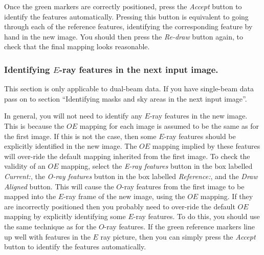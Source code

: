 \documentclass[11pt]{article}
\newcommand{\htmlref}[2]{#1}
\begin{document}
Once the green markers are correctly positioned, press the
\htmlref{\emph{Accept}}{POLKA_ACCEPT} button to identify the features
automatically. Pressing this button is equivalent to going
through each of the reference features, identifying the corresponding
feature by hand in the new image. You should then press the \htmlref{{\em
Re-draw}}{POLKA_REDRAW} button again, to check that the final mapping
looks reasonable.

\subsubsection {Identifying $E$-ray features in the next input image.}
This section is only applicable to dual-beam data. If you have
single-beam data pass on to section ``\htmlref{Identifying masks and sky areas in the next input image}
{TUT_NEXT_MASK}''.

In general, you will not need to identify any $E$-ray features in the new
image. This is because the $OE$ mapping for each image is assumed to be
the same as for the first image. If this is not the case, then some
$E$-ray features should be explicitly identified in the new image. The
$OE$ mapping implied by these features will over-ride the default mapping
inherited from the first image. To check the validity of an $OE$
mapping, select the \emph{E-ray features} button in the box labelled
\htmlref{\emph{Current:}}{POLKA_CURRENT}, the \emph{O-ray features} button in
the box labelled \htmlref{\emph{Reference:}}{POLKA_REFERENCE}, and the
\htmlref{\emph{Draw Aligned}}{POLKA_DRAW_ALIGNED} button. This will cause
the $O$-ray features from the first image to be mapped into the $E$-ray
frame of the new image, using the $OE$ mapping. If they are incorrectly
positioned then you probably need to over-ride the default $OE$ mapping
by explicitly identifying some $E$-ray features. To do this, you should
use the same technique as for the $O$-ray features. If the green
reference markers line up well with features in the $E$ ray picture, then
you can simply press the \htmlref{\emph{Accept}}{POLKA_ACCEPT} button to
identify the features automatically.
\end{document}
